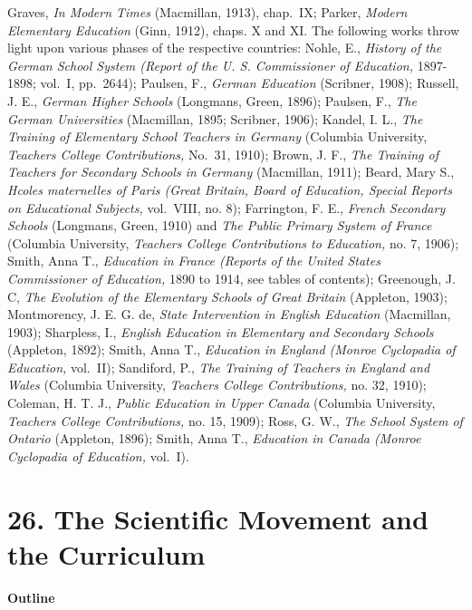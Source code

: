 \documentclass[
]{book}
\begin{document}
Graves, \emph{In Modern Times} (Macmillan, 1913), chap.~IX; Parker, \emph{Modern Elementary Education} (Ginn, 1912), chaps. X and XI. The following works throw light upon various phases of the respective\protect\hypertarget{ch25.xmlux5cux23para.475.1.0.box.288.231.1059.1275.q.50}{}{ countries: Nohle, E., \emph{History of the German School System (Report of the U. S. Commissioner of Education,} 1897-1898; vol.~I, pp.~2644); Paulsen, F., \emph{German Education} (Scribner, 1908); Russell, J. E., \emph{German Higher Schools} (Longmans, Green, 1896); Paulsen, F., \emph{The German Universities} (Macmillan, 1895; Scribner, 1906); Kandel, I. L., \emph{The Training of Elementary School Teachers in Germany} (Columbia University, \emph{Teachers College Contributions,} No.~31, 1910); Brown, J. F., \emph{The Training of Teachers for Secondary Schools in Germany} (Macmillan, 1911); Beard, Mary S., \emph{Hcoles maternelles of Paris (Great Britain, Board of Education, Special Reports on Educational Subjects,} vol.~VIII, no. 8); Farrington, F. E., \emph{French Secondary Schools} (Longmans, Green, 1910) and \emph{The Public Primary System of France} (Columbia University, \emph{Teachers College Contributions to Education,} no. 7, 1906); Smith, Anna T., \emph{Education in France (Reports of the United States Commissioner of Education,} 1890 to 1914, see tables of contents); Greenough, J. C, \emph{The Evolution of the Elementary Schools of Great Britain} (Appleton, 1903); Montmorency, J. E. G. de, \emph{State Intervention in English Education} (Macmillan, 1903); Sharpless, I., \emph{English Education in Elementary and Secondary Schools} (Appleton, 1892); Smith, Anna T., \emph{Education in England (Monroe Cyclopadia of Education,} vol.~II); Sandiford, P., \emph{The Training of Teachers in England and Wales} (Columbia University, \emph{Teachers College Contributions,} no. 32, 1910); Coleman, H. T. J., \emph{Public Education in Upper Canada} (Columbia University, \emph{Teachers College Contributions,} no. 15, 1909); Ross, G. W., \emph{The School System of Ontario} (Appleton, 1896); Smith, Anna T., \emph{Education in Canada (Monroe Cyclopadia of Education,} vol.~I).}

\hypertarget{the-scientific-movement-and-the-curriculum}{%
\chapter{26. The Scientific Movement and the Curriculum}\label{the-scientific-movement-and-the-curriculum}}

\textbf{Outline}
\end{document}

